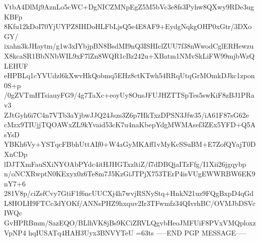 VtbA4DlMj9AznLo5cWC+DgNICZMNpEgZ5M5bVc3e8fs3Pyhw8QXwy9RDe3ugKBFp
8Kfu12kDoI70YjUYPZ8IHDoHLFbLjsQ5e4E8AF9+EydgNqkgOHP0xGtr/3DXoGY/
ixahn3kJHaytm/g1w3xIYbjpBN8BsdMI9nQ3ISHIclZUU7f38nWwodCglERHewzu
X8kcaSR1BbNNbWIL9xF7lZn8WQR1cBz242u+XBatm1NMvSkLiFW99mjbWzQLEHUF
eHPBLq1cYVUdzl6kXwvHkQobmq5EHz8ctKTwh54RRqUtqGrMOmkDJkc1zpon0S+p
/0gZVTmHTsiauyFG9/4g7TaXc+eoyUy8OnsJFUJHZTTSpTes5swKiF8zBJ1PRav3
ZJtGyh6i7C4n7VTb3aYjbwJJQ24Jszs3Z6p7HkTxzDPSN3Jfw35/iA61F87sG62e
cMzx9TIUjjTQOAWxZL9kYvaid53cK7u4naKbepYdgMWMAsef3ZEx5YFD+Q5AsYsD
YBKh6Vy+YSTqcFBbhUttAIf0+W4aGyMKAff1vMyKcSSuBM+E7ZofQYajT0DXnCDp
lDJTXmFauSXiNYOAbPYdc4itHJHGTxzltiZ/f7dDBQjaITzFfg/I1Xii26jgqybp
n/oNCXRwptN0KExyx0z6Te8m7J5KzGiJTPjX753TErP4isVUgEWWRBW6EK9nY7+6
281V8p/ciZsfCvy7GtiF1f6ncUUCXj4h7wvjRSNyStq+HnkN21uz9FQgBxpD4qGd
L8HOLH9FTCc3dYOKf/ANNsPHZ9hxquv2Ir3TFwmfz34QIvrhBC/OVMJbDSVcIWQc
GvHPRBmm/SazEQO/BLlhVK8jBs9KCiZRVLQgvbHeoJMFUiF8PVxVMQploxzVpNP4
hqIUSATq4HAH3Uyx3BNVYTeU
=63ts
-----END PGP MESSAGE-----
